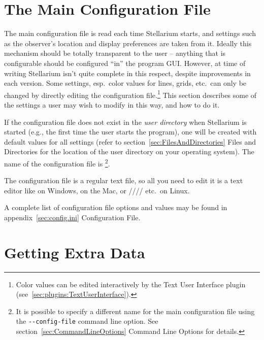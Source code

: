 \section{The Main Configuration File}
\label{sec:ConfigurationFile}

The main configuration file is read each time Stellarium starts, and
settings such as the observer's location and display preferences are
taken from it. Ideally this mechanism should be totally transparent to
the user -- anything that is configurable should be configured ``in''
the program GUI. However, at time of writing Stellarium isn't quite
complete in this respect, despite improvements in each version. Some
settings, esp.\ color values for lines, grids, etc.\ can only be
changed by directly editing the configuration file.\footnote{Color
  values can be edited interactively by the Text User Interface plugin
  (see~\ref{sec:plugins:TextUserInterface}).} This section describes
some of the settings a user may wish to modify in this way, and how to
do it.

If the configuration file does not exist in the \emph{user directory}
when Stellarium is started (e.g., the first time the user starts the
program), one will be created with default values for all settings
(refer to section~\ref{sec:FilesAndDirectories} Files and
Directories for the location of the user directory on your operating
system). The name of the configuration file is
\footnote{It is possible to specify a different name
  for the main configuration file using the \texttt{-\/-config-file}
  command line option. See section~\ref{sec:CommandLineOptions} Command 
  Line Options for details.}.

The configuration file is a regular text file, so all you need to edit
it is a text editor like  on Windows,  on
the Mac, or //// etc.\ on Linux.

A complete list of configuration file options and values may be found
in appendix~\ref{sec:config.ini} Configuration File.



\section{Getting Extra Data}
\label{sec:ExtraData}

